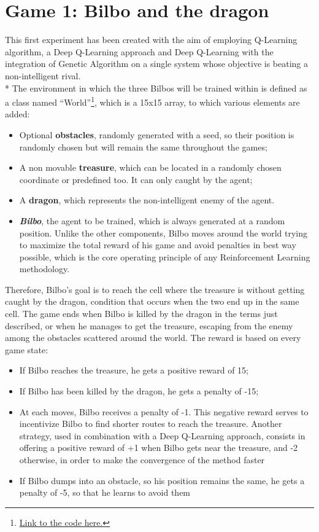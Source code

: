\section{Game 1: Bilbo and the dragon}
This first experiment has been created with the aim of employing Q-Learning algorithm, a Deep Q-Learning approach and Deep Q-Learning with the integration of Genetic Algorithm on a single system whose objective is beating a non-intelligent rival.\\*
The environment in which the three Bilbos will be trained within is defined as a class named ``World''\footnote{\href{https://github.com/moiraghif/DragonHunting/blob/master/Bilbo\%20World/CreateBilboWorld.py}{Link to the code here.}}, which is a 15x15 array, to which various elements are added:
\begin{itemize}[noitemsep, topsep=0ex]
  \item Optional \textbf{obstacles}, randomly generated with a seed, so their position is randomly chosen but will remain the same throughout the games;
  \item A non movable \textbf{treasure}, which can be located in a randomly chosen coordinate or predefined too. It can only caught by the agent;
  \item A \textbf{dragon}, which represents the non-intelligent enemy of the agent.
  \item \textit{\textbf{Bilbo}}, the agent to be trained, which is always generated at a random position. Unlike the other components, Bilbo moves around the world trying to maximize the total reward of his game and avoid penalties in best way possible, which is the core operating principle of any Reinforcement Learning methodology.
\end{itemize}
Therefore, Bilbo's goal is to reach the cell where the treasure is without getting caught by the dragon, condition that occurs when the two end up in the same cell. The game ends when Bilbo is killed by the dragon in the terms just described, or when he manages to get the treasure, escaping from the enemy among the obstacles scattered around the world. The reward is based on every game state:
\begin{itemize}[noitemsep, topsep=0ex]
  \item If Bilbo reaches the treasure, he gets a positive reward of 15;
  \item If Bilbo has been killed by the dragon, he gets a penalty of -15;
  \item At each moves, Bilbo receives a penalty of -1. This negative reward serves to incentivize Bilbo to find shorter routes to reach the treasure. Another strategy, used in combination with a Deep Q-Learning approach, consists in offering a positive reward of +1 when Bilbo gets near the treasure, and -2 otherwise, in order to make the convergence of the method faster
  \item If Bilbo dumps into an obstacle, so his position remains the same, he gets a penalty of -5, so that he learns to avoid them
\end{itemize}
